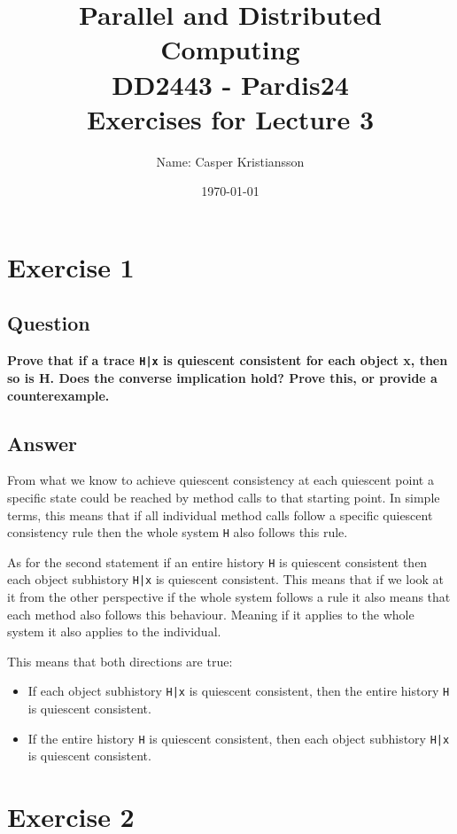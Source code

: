 \documentclass{article}
\title{\textbf{Parallel and Distributed Computing\\DD2443 - Pardis24\\Exercises for Lecture 3}}
\author{Name: Casper Kristiansson}
\date{\today}
\begin{document}
\setlength\parindent{0pt}
\setlength{\parskip}{\bigskipamount}

\maketitle

\section*{Exercise 1}
\subsection*{Question}
\textbf{Prove that if a trace \texttt{H|x} is quiescent consistent for each object x, then so is H. Does the converse implication hold? Prove this, or provide a counterexample.}

\subsection*{Answer}
From what we know to achieve quiescent consistency at each quiescent point a specific state could be reached by method calls to that starting point. In simple terms, this means that if all individual method calls follow a specific quiescent consistency rule then the whole system \texttt{H} also follows this rule.

As for the second statement if an entire history \texttt{H} is quiescent consistent then each object subhistory \texttt{H|x} is quiescent consistent. This means that if we look at it from the other perspective if the whole system follows a rule it also means that each method also follows this behaviour. Meaning if it applies to the whole system it also applies to the individual.

This means that both directions are true:

\begin{itemize}
    \item If each object subhistory \texttt{H|x} is quiescent consistent, then the entire history \texttt{H} is quiescent consistent.
    \item If the entire history \texttt{H} is quiescent consistent, then each object subhistory \texttt{H|x} is quiescent consistent.
\end{itemize}




\section*{Exercise 2}
\end{document}

